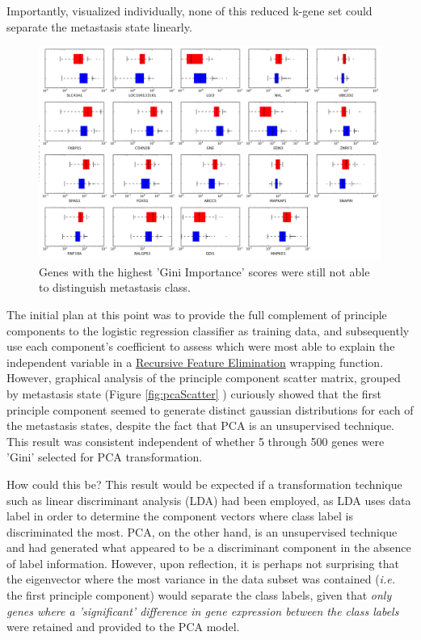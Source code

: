 \documentclass[final]{article}
\begin{document}
Importantly, visualized individually, none of this reduced k-gene set could separate the metastasis
state linearly.

\begin{figure}[h]
  \centering
  \includegraphics[width=\textwidth]{boxplots}
  \caption{\label{fig:separate}Genes with the highest 'Gini Importance' scores were still not able to distinguish metastasis class.}
\end{figure}

The initial plan at this point was to provide the full complement of principle components to the logistic regression classifier as training data, and
subsequently use each component's coefficient to  assess which were most able to
explain the independent variable in a \href{http://scikit-learn.org/0.15/modules/generated/sklearn.feature_selection.RFECV.html#sklearn.feature_selection.RFECV}{Recursive Feature Elimination}
wrapping function.  However, graphical analysis of the principle component scatter matrix, grouped by
metastasis state (Figure \ref{fig:pcaScatter} ) curiously showed that the first principle
component seemed to generate distinct gaussian distributions for each of the metastasis states, despite the fact that PCA is an unsupervised technique.  This result was consistent independent of
whether 5 through 500 genes were 'Gini' selected for PCA transformation.

How could this be?  This result would be expected if a transformation technique
such as linear discriminant analysis (LDA) had been employed, as LDA uses data
label in order to determine the component vectors where class label is
discriminated the most.  PCA, on the other hand, is an unsupervised technique
and had generated what appeared to be a discriminant component in the absence of
label information.  However, upon reflection, it is perhaps not surprising that
the eigenvector where the most variance in the data subset was contained (\textit{i.e.}
the first principle component) would separate the class labels, given that
\textit{only genes where a 'significant' difference in gene expression between the
class labels} were retained and provided to the PCA model.
\end{document}
